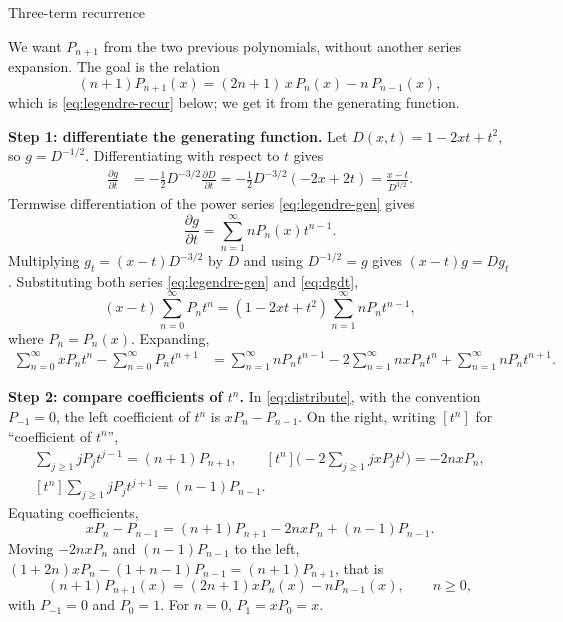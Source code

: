 \documentclass[11pt]{beamer}
\begin{document}
\begin{frame}[allowframebreaks=1.00]{Three-term recurrence}
\footnotesize

We want $P_{n+1}$ from the two previous polynomials, without another series expansion. The
goal is the relation
\[
 (n+1)P_{n+1}(x)=(2n+1)\,x\,P_n(x)-n\,P_{n-1}(x),
\]
which is \eqref{eq:legendre-recur} below; we get it from the generating function.

\textbf{Step 1: differentiate the generating function.}  Let
$D(x,t)=1-2xt+t^2$, so $g=D^{-1/2}$. Differentiating with respect to $t$ gives
\begin{align*}
  \frac{\partial g}{\partial t}
  &=-\frac12D^{-3/2}\frac{\partial D}{\partial t}
  =-\frac12D^{-3/2}(-2x+2t)
  =\frac{x-t}{D^{3/2}}.
\end{align*}
Termwise differentiation of the power series \eqref{eq:legendre-gen} gives
\begin{equation}
  \frac{\partial g}{\partial t}
  =\sum_{n=1}^{\infty}nP_n(x)t^{n-1}.
  \label{eq:dgdt}
\end{equation}
Multiplying $g_t=(x-t)D^{-3/2}$ by $D$ and using $D^{-1/2}=g$ gives $(x-t)g=Dg_t$.  Substituting both series \eqref{eq:legendre-gen} and \eqref{eq:dgdt},
\[
  (x-t)\sum_{n=0}^{\infty}P_nt^n
  =(1-2xt+t^2)\sum_{n=1}^{\infty}nP_nt^{n-1},
\]
where $P_n=P_n(x)$. Expanding,
\begin{align}
  \sum_{n=0}^{\infty}xP_nt^n
  -\sum_{n=0}^{\infty}P_nt^{n+1}
  &=\sum_{n=1}^{\infty}nP_nt^{n-1}
    -2\sum_{n=1}^{\infty}nxP_nt^n
    +\sum_{n=1}^{\infty}nP_nt^{n+1}.
  \label{eq:distribute}
\end{align}

\textbf{Step 2: compare coefficients of $t^n$.}  In \eqref{eq:distribute}, with the convention $P_{-1}=0$, the left coefficient of $t^n$ is $xP_n-P_{n-1}$.
On the right, writing $[t^n]$ for ``coefficient of $t^n$'',
\begin{gather*}
  [t^n]\sum_{j\ge1}jP_jt^{j-1}=(n+1)P_{n+1},
  \qquad
  [t^n]\bigl(-2\sum_{j\ge1}jxP_jt^j\bigr)=-2nxP_n,\\
  [t^n]\sum_{j\ge1}jP_jt^{j+1}=(n-1)P_{n-1}.
\end{gather*}
Equating coefficients,
\[
  xP_n-P_{n-1}
  =(n+1)P_{n+1}-2nxP_n+(n-1)P_{n-1}.
\]
Moving $-2nxP_n$ and $(n-1)P_{n-1}$ to the left,
$(1+2n)xP_n-(1+n-1)P_{n-1}=(n+1)P_{n+1}$, that is
\begin{equation}
  (n+1)P_{n+1}(x)
  =(2n+1)xP_n(x)-nP_{n-1}(x),
  \qquad n\ge0,
  \label{eq:legendre-recur}
\end{equation}
with $P_{-1}=0$ and $P_0=1$. For $n=0$, $P_1=xP_0=x$.
\end{frame}
\end{document}
